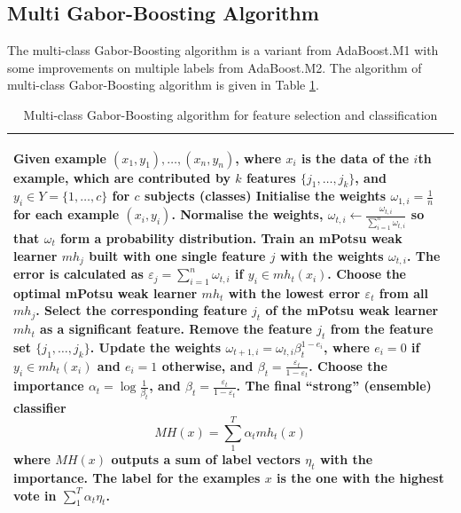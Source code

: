 \subsection{Multi Gabor-Boosting Algorithm}
The multi-class Gabor-Boosting algorithm is a variant from AdaBoost.M1 with some improvements on multiple labels from AdaBoost.M2. The algorithm of multi-class Gabor-Boosting algorithm is given in \mbox{Table} \ref{tab:multigaborboosting}.
\begin{table}
\caption{Multi-class Gabor-Boosting algorithm for feature selection and classification}
\begin{tabular}{p{\columnwidth}}
\hline
\begin{algorithmic}[1]
\STATE Given example $(x_{1},y_{1}),\ldots,(x_{n},y_{n})$, where $x_{i}$ is the data of the $i$th example, which are contributed by $k$ features $\{j_{1},\ldots,j_{k}\}$, and $y_{i} \in Y=\{1,\ldots,c\}$ for $c$ subjects (classes)
\STATE Initialise the weights $\omega_{1,i}=\frac{1}{n}$ for each example $(x_i,y_i)$.
\FOR{$t=1,\ldots,T$}
	\STATE Normalise the weights, $\omega_{t,i}\leftarrow\frac{\omega_{t,i}}{\sum_{i=1}^{n}\omega_{t,i}}$ so that $\omega_{t}$ form a probability distribution.
	\FORALL{$\{j_{1},\ldots,j_{k}\}$}
		\STATE Train an mPotsu weak learner $mh_{j}$ built with one single feature $j$ with the weights $\omega_{t,i}$.
		\STATE The error is calculated as $\varepsilon_{j}=\sum_{i=1}^{n}\omega_{t,i}$ if $y_i \in mh_t(x_i)$.
	\ENDFOR
	\STATE Choose the optimal mPotsu weak learner $mh_{t}$ with the lowest error $\varepsilon_{t}$ from all $mh_{j}$.
	\STATE Select the corresponding feature $j_{t}$ of the mPotsu weak learner $mh_{t}$ as a significant feature.
	\STATE Remove the feature $j_{t}$ from the feature set $\{j_{1},\ldots,j_{k}\}$.
	\STATE Update the weights $\omega_{t+1,i}=\omega_{t,i}\beta_{t}^{1-e_{i}}$, where $e_{i}=0$ if $y_i \in mh_t(x_i)$ and $e_{i}=1$ otherwise, and $\beta_{t}=\frac{\varepsilon_{t}}{1-\varepsilon_{t}}$.
	\STATE Choose the importance $\alpha_{t}=\log\frac{1}{\beta_{t}}$, and $\beta_{t}=\frac{\varepsilon_{t}}{1-\varepsilon_{t}}$.
\ENDFOR
\STATE The final ``strong'' (ensemble) classifier
\begin{displaymath}
 MH(x) = \sum_1^T \alpha_t mh_t(x)
\end{displaymath}
where $MH(x)$ outputs a sum of label vectors $\eta_t$ with the importance. The label for the examples $x$ is the one with the highest vote in $\sum_1^T \alpha_t \eta_t$.
\end{algorithmic}\\
\hline
\end{tabular}
\label{tab:multigaborboosting}
\end{table}

